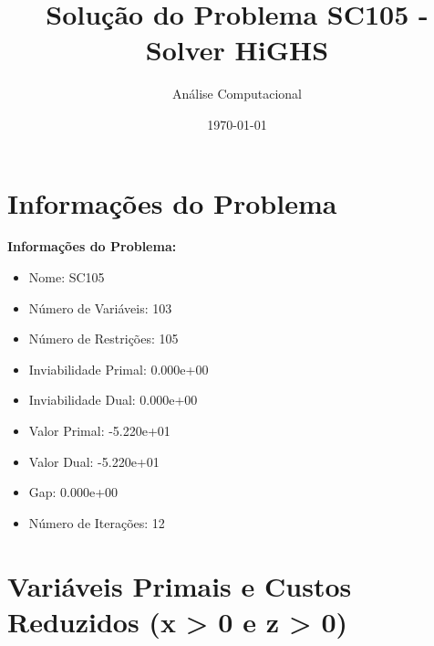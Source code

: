 \documentclass[12pt]{article}
\title{Solução do Problema SC105 - Solver HiGHS}
\author{Análise Computacional}
\date{\today}
\begin{document}
\maketitle

\section{Informações do Problema}

\textbf{Informações do Problema:}
\begin{itemize}
\item Nome: SC105
\item Número de Variáveis: 103
\item Número de Restrições: 105
\item Inviabilidade Primal: 0.000e+00
\item Inviabilidade Dual: 0.000e+00
\item Valor Primal: -5.220e+01
\item Valor Dual: -5.220e+01
\item Gap: 0.000e+00
\item Número de Iterações: 12
\end{itemize}


\section{Variáveis Primais e Custos Reduzidos (x > 0 e z > 0)}
\end{document}
